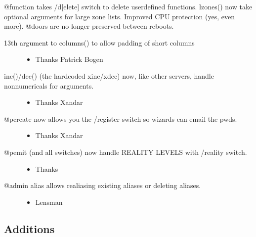 \documentclass[letterpaper,10pt,english]{sphinxmanual}
\begin{document}
\sphinxAtStartPar
@function takes /d{[}elete{]} switch to delete user\sphinxhyphen{}defined functions.
lzones() now take optional arguments for large zone lists.
Improved CPU protection (yes, even more).
@doors are no longer preserved between reboots.
\begin{description}
\item[{13th argument to columns() to allow padding of short columns}] \leavevmode\begin{itemize}
\item {} 
\sphinxAtStartPar
Thanks Patrick Bogen

\end{itemize}

\item[{inc()/dec() (the hardcoded xinc/xdec) now, like other servers, handle non\sphinxhyphen{}numericals for arguments.}] \leavevmode\begin{itemize}
\item {} 
\sphinxAtStartPar
Thanks Xandar

\end{itemize}

\item[{@pcreate now allows you the /register switch so wizards can email the pwds.}] \leavevmode\begin{itemize}
\item {} 
\sphinxAtStartPar
Thanks Xandar

\end{itemize}

\item[{@pemit (and all switches) now handle REALITY LEVELS with /reality switch.}] \leavevmode\begin{itemize}
\item {} 
\sphinxAtStartPar
Thanks 

\end{itemize}

\item[{@admin alias allows re\sphinxhyphen{}aliasing existing aliases or deleting aliases.}] \leavevmode\begin{itemize}
\item {} 
\sphinxAtStartPar
Lensman

\end{itemize}

\end{description}


\subsection{Additions}
\label{\detokenize{changelog:id12}}
\end{document}
